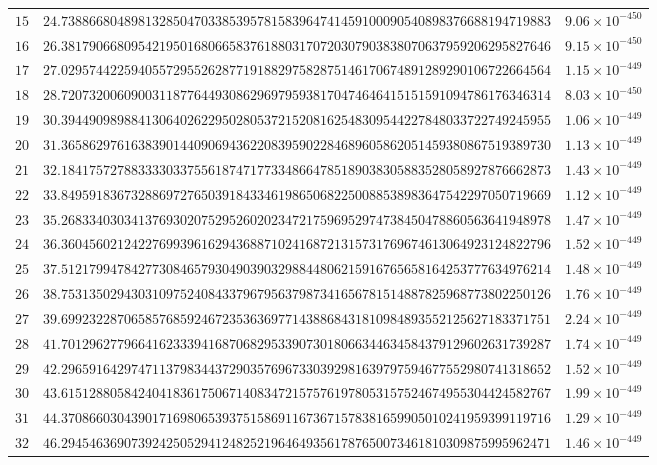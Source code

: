 \documentclass[12pt,reqno]{amsart}
\theoremstyle{remark}
\begin{document}
\begin{longtable}{clc}
$15$ & $24.7388668048981328504703385395781583964741459100090540898376688194719883$ & $9.06\times 10^{-450}$ \\
$16$ & $26.3817906680954219501680665837618803170720307903838070637959206295827646$ & $9.15\times 10^{-450}$ \\
$17$ & $27.0295744225940557295526287719188297582875146170674891289290106722664564$ & $1.15\times 10^{-449}$ \\
$18$ & $28.7207320060900311877644930862969795938170474646415151591094786176346314$ & $8.03\times 10^{-450}$ \\
$19$ & $30.3944909898841306402622950280537215208162548309544227848033722749245955$ & $1.06\times 10^{-449}$ \\
$20$ & $31.3658629761638390144090694362208395902284689605862051459380867519389730$ & $1.13\times 10^{-449}$ \\
$21$ & $32.1841757278833330337556187471773348664785189038305883528058927876662873$ & $1.43\times 10^{-449}$ \\
$22$ & $33.8495918367328869727650391843346198650682250088538983647542297050719669$ & $1.12\times 10^{-449}$ \\
$23$ & $35.2683340303413769302075295260202347217596952974738450478860563641948978$ & $1.47\times 10^{-449}$ \\
$24$ & $36.3604560212422769939616294368871024168721315731769674613064923124822796$ & $1.52\times 10^{-449}$ \\
$25$ & $37.5121799478427730846579304903903298844806215916765658164253777634976214$ & $1.48\times 10^{-449}$ \\
$26$ & $38.7531350294303109752408433796795637987341656781514887825968773802250126$ & $1.76\times 10^{-449}$ \\
$27$ & $39.6992322870658576859246723536369771438868431810984893552125627183371751$ & $2.24\times 10^{-449}$ \\
$28$ & $41.7012962779664162333941687068295339073018066344634584379129602631739287$ & $1.74\times 10^{-449}$ \\
$29$ & $42.2965916429747113798344372903576967330392981639797594677552980741318652$ & $1.52\times 10^{-449}$ \\
$30$ & $43.6151288058424041836175067140834721575761978053157524674955304424582767$ & $1.99\times 10^{-449}$ \\
$31$ & $44.3708660304390171698065393751586911673671578381659905010241959399119716$ & $1.29\times 10^{-449}$ \\
$32$ & $46.2945463690739242505294124825219646493561787650073461810309875995962471$ & $1.46\times 10^{-449}$ \\

\end{longtable}
\end{document}
